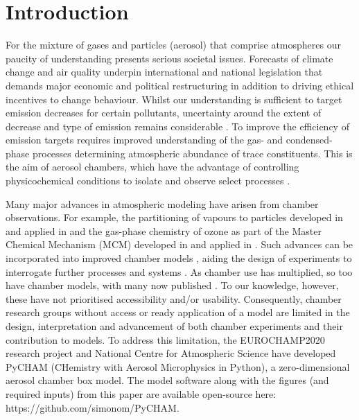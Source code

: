 \documentclass[gmd, manuscript]{copernicus}
\begin{document}

\section{Introduction}\label{sec:intro}

For the mixture of gases and particles (aerosol) that comprise atmospheres our paucity of understanding presents serious societal issues.  Forecasts of climate change and air quality underpin international and national legislation \citep[e.g.][]{UNFCCC2018, UKEnvironmentBill2020, EUAQ2020} that demands major economic and political restructuring \citep{MIT2020} in addition to driving ethical incentives to change behaviour.  Whilst our understanding is sufficient to target emission decreases for certain pollutants, uncertainty around the extent of decrease and type of emission remains considerable \citep{Heal2012, Johnson2018, Tong2019}.  To improve the efficiency of emission targets requires improved understanding of the gas- and condensed-phase processes determining atmospheric abundance of trace constituents.  This is the aim of aerosol chambers, which have the advantage of controlling physicochemical conditions to isolate and observe select processes \citep{Schwantes2017, Charan2019}.

Many major advances in atmospheric modeling have arisen from chamber observations.  For example, the partitioning of vapours to particles developed in \citet{Odum1996} and applied in \citet[e.g.][]{Meng1997} and the gas-phase chemistry of ozone as part of the Master Chemical Mechanism (MCM) developed in \citet{Jenkin1997} and applied in \citet[e.g.][]{Ying2011}.  Such advances can be incorporated into improved chamber models \citep[e.g.][]{Charan2019}, aiding the design of experiments to interrogate further processes and systems \citep[e.g.][]{Riva2020}.  As chamber use has multiplied, so too have chamber models, with many now published \citep{Naumann2003, Pierce2008, Lowe2009, Roldin2014, Sunol2018, Topping2018, Charan2019, Roldin2019}.  To our knowledge, however, these have not prioritised accessibility and/or usability.  Consequently, chamber research groups without access or ready application of a model are limited in the design, interpretation and advancement of both chamber experiments and their contribution to models.  To address this limitation, the EUROCHAMP2020 \citep{EUROCHAMP2020} research project and National Centre for Atmospheric Science have developed PyCHAM (CHemistry with Aerosol Microphysics in Python), a zero-dimensional aerosol chamber box model.  The model software along with the figures (and required inputs) from this paper are available open-source here: https://github.com/simonom/PyCHAM.
\end{document}
